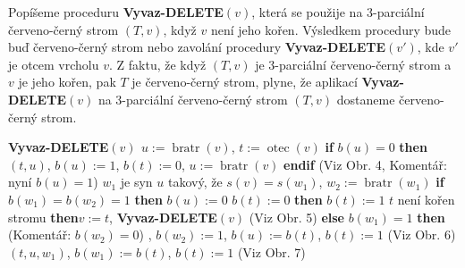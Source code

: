 \documentclass[a4paper,12pt]{article}
\DeclareMathOperator*{\otec}{otec}
\DeclareMathOperator*{\bratr}{bratr}
\begin{document}
Popíšeme proceduru {\bf Vyvaz-DELETE$(v)$}, která se 
použije na 3-parciální červeno-černý strom $(T,v)$, když $
v$ není jeho 
kořen.  Výsledkem procedury bude buď červeno-černý strom 
nebo zavolání procedury {\bf Vyvaz-DELE\-TE$(v')$}, kde $v'$ je otcem 
vrcholu $v$.  Z faktu, že když $(T,v)$ je 3-parciální červeno-černý 
strom a $v$ je jeho kořen, pak $T$ je červeno-černý strom, plyne, 
že aplikací {\bf Vyvaz-DELETE$(v)$} na 3-parciální červeno-černý strom 
$(T,v)$ dostaneme červeno-černý strom.  

{\bf Vyvaz-DELETE$(v)$\newline 
$u:=\bratr(v)$}, $t:=\otec(v)$\newline 
{\bf if} $b(u)=0$ {\bf then}\newline 
\phantom{---}{\bf Rotace}$(t,u)$, $b(u):=1$, $b(t):=0$, $u:=\bratr(v)$\newline 
{\bf endif\newline}
(Viz Obr. 4, Komentář: nyní $b(u)=1$)\newline 
$w_1$ je syn $u$ takový, že $s(v)=s(w_1)$, $w_2:=\bratr(w_1)$\newline 
{\bf if} $b(w_1)=b(w_2)=1$ {\bf then}\newline 
\phantom{---}$b(u):=0$\newline 
\phantom{---}{\bf if} $b(t):=0$ {\bf then}\newline 
\phantom{------}$b(t):=1$\newline 
\phantom{---}{\bf else}\newline 
\phantom{------}{\bf if} $t$ není kořen stromu {\bf then}\newline \phantom{---------}$v:=t$, {\bf Vyvaz-DELETE}$(v)$\newline 
\phantom{------}{\bf endif}\newline 
\phantom{---}{\bf endif} (Viz Obr. 5)\newline 
{\bf else}\newline 
\phantom{---}{\bf if} $b(w_1)=1$ {\bf then}\newline 
(Komentář: $b(w_2)=0$)\newline 
\phantom{------}{\bf Rotace$(t,u)$}, $b(w_2):=1$, $b(u):=b(t)$, $b(t):=1$ (Viz Obr. 6)\newline 
\phantom{---}{\bf else}\newline 
\phantom{------}{\bf Dvojita-rotace}$(t,u,w_1)$, $b(w_1):=b(t)$, $b(t):=1$ (Viz Obr. 7)\newline
\phantom{---}{\bf endif\newline 
endif}
\end{document}

